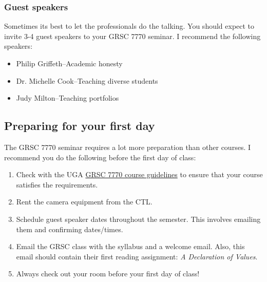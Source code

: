 \subsubsection{Guest speakers}
\label{sec:guest-speakers}

Sometimes its best to let the professionals do the talking.  You should expect to invite 3-4 guest speakers to your GRSC 7770 seminar.  I recommend the following speakers:
\begin{itemize}
\item Philip Griffeth--Academic honesty
\item Dr. Michelle Cook--Teaching diverse students
\item Judy Milton--Teaching portfolios
\end{itemize}



\subsection{Preparing for your first day}
\label{sec:preparing-your-first}

The GRSC 7770 seminar requires a lot more preparation than other courses.  I recommend you do the following before the first day of class:

\begin{enumerate}
\item Check with the UGA \href{https://github.com/WilliamOlsen/GRSC-2018/blob/master/Lectures/Week-0/GRSC7770-Guidelines-2018.pdf}{GRSC 7770 course guidelines} to ensure that your course satisfies the requirements.
\item Rent the camera equipment from the CTL.
\item Schedule guest speaker dates throughout the semester.  This involves emailing them and confirming dates/times.
\item Email the GRSC class with the syllabus and a welcome email.  Also, this email should contain their first reading assignment: \emph{A Declaration of Values}. 
\item Always check out your room before your first day of class! 
\end{enumerate}


